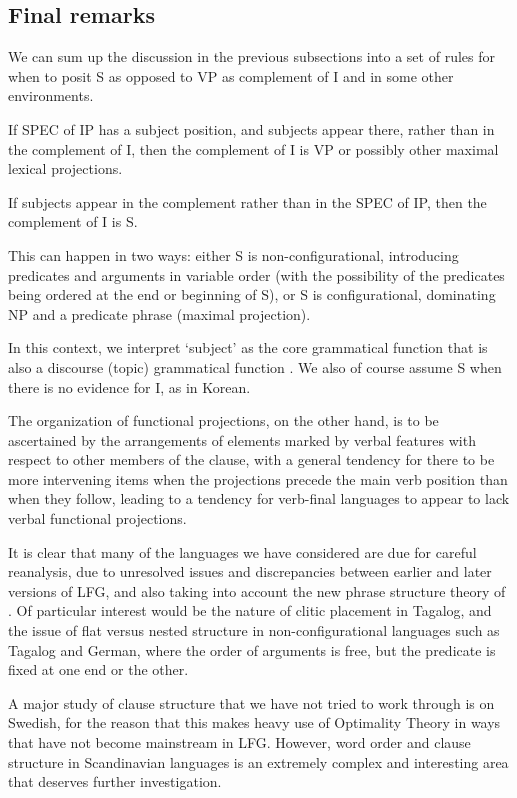 \documentclass[output=paper,hidelinks]{langscibook}
\begin{document}
\subsection{Final remarks}\label{final}
We can sum up the discussion in the previous subsections into a set of rules for when
to posit S as opposed to VP as complement of I and in some other environments.
\ea
\begin{xlist}
\item If SPEC of IP has a subject position, and subjects appear there, rather
than in the complement of I, then the complement of I is VP or possibly other
maximal lexical projections.
\item If subjects appear in the complement rather than in the SPEC of IP, then the complement
of I is S.
\item This can happen in two ways: either S is non-configurational, introducing predicates
and arguments in variable order (with the possibility of the predicates being ordered
at the end or beginning of S), or S is configurational, dominating NP and a predicate phrase
(maximal projection).
\end{xlist}
\z
In this context, we interpret `subject' as the core grammatical function
\citep[97]{BresnanEtAl2016} that is also a discourse (topic) grammatical
function \citep[100]{BresnanEtAl2016}.
We also of course assume S when there is no evidence for I, as in Korean.

The organization of functional projections, on the other hand, is to be ascertained
by the arrangements of elements marked by verbal features with respect to other
members of the clause, with a general tendency for there to be more intervening
items when the projections precede the main verb position than when they follow, leading
to a tendency for verb-final languages to appear to lack verbal functional
projections.

It is clear that many of the languages we have considered are due for careful
reanalysis, due to unresolved issues and discrepancies between earlier and later versions
of LFG, and also taking into account the new phrase structure theory of \citet{low:lov:20}.
Of particular interest would be the nature of clitic placement in Tagalog, and
the issue of flat versus nested structure in non-configurational languages such
as Tagalog and German, where the order of arguments is free, but the predicate is
fixed at one end or the other.

A major study of clause structure that we have not tried to work through is
\citet{sells2001} on Swedish, for the reason that this makes heavy use of Optimality
Theory in ways that have not become mainstream in LFG.  However, word order and clause
structure in Scandinavian languages is an extremely complex and interesting area
that deserves further investigation.
\end{document}
